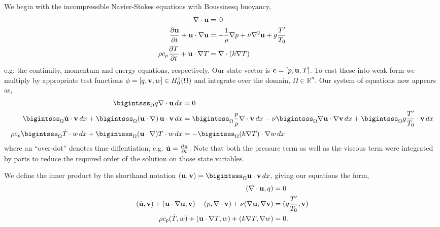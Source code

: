 We begin with the incompressible Navier-Stokes equations with Boussinesq
buoyancy,
\begin{align}
 \nabla \cdot {\bf u} &= \, 0 \label{eq_cont}\\
 \frac{\partial {\bf u}}{\partial t} + {\bf u} \cdot \nabla {\bf u} &= -\frac{1}{\rho}
 \nabla p + \nu \nabla^2 {\bf u} + g \frac{T'}{T_0} \label{eq_mom}\\
 \rho c_p \frac{\partial T}{\partial t} + {\bf u} \cdot \nabla T &= \nabla
 \cdot (k \nabla T) \label{eq_energy}
\end{align}
e.g. the continuity, momentum and energy equations, respectively. Our 
state vector is ${\bf c} =  \left[p,{\bf u},T \right]$. To cast these into
weak form we multiply by appropriate test 
functions ${\bf \phi} = \left[q,{\bf v},w \right] \in H^1_0(\Omega)$ and
integrate over the domain, $\Omega \in \mathbb{R}^n$. Our system of
equations now appears as, 
\begin{align}
  \bigintsss_\Omega q \nabla \cdot {\bf u} \, dx &= 0 \\
 \bigintsss_\Omega \dot {\bf u} \cdot {\bf v} \, dx +
 \bigintsss_\Omega  ({\bf u} \cdot \nabla) \, {\bf u} \cdot {\bf v} \, dx &=
 \bigintsss_\Omega \frac{p}{\rho} \nabla \cdot {\bf v} \, dx - \nu \bigintsss_\Omega \nabla {\bf u} \cdot \nabla {\bf v}
 \,dx + \bigintsss_\Omega g \frac{T'}{T_0} \cdot {\bf v} \, dx \\ 
 \rho c_p \bigintsss_\Omega \dot T \cdot w \, dx + \bigintsss_\Omega ({\bf u}
 \cdot \nabla) T \cdot w \, dx  &= -\bigintsss_\Omega (k \nabla T) \cdot
 \nabla w \, dx
\end{align}
%
where an ``over-dot'' denotes time diffentiation, e.g. $\dot {\bf u} =
\frac{\partial {\bf u}}{\partial t}$. Note that both the pressure term as well
as the viscous term were integrated by parts to reduce the required
order of the solution on those state variables.  

We define the inner product by the shorthand notation $({\bf u},{\bf v}) =
\bigintsss_\Omega {\bf u}\cdot {\bf v}\, dx $, giving our equations the form,  
\begin{align}
 (\nabla \cdot {\bf u}, q) &= 0 \\
 (\dot {\bf u},{\bf v}) + ({\bf u} \cdot \nabla {\bf u}, {\bf v}) - (p,\nabla \cdot {\bf v}) + \nu (\nabla
 {\bf u}, \nabla {\bf v}) &= (g \frac{T'}{T_0},{\bf v}) \\
 \rho c_p (\dot T,w) + ({\bf u} \cdot \nabla T,w) + (k \nabla T,\nabla w) &= 0.
\end{align}

